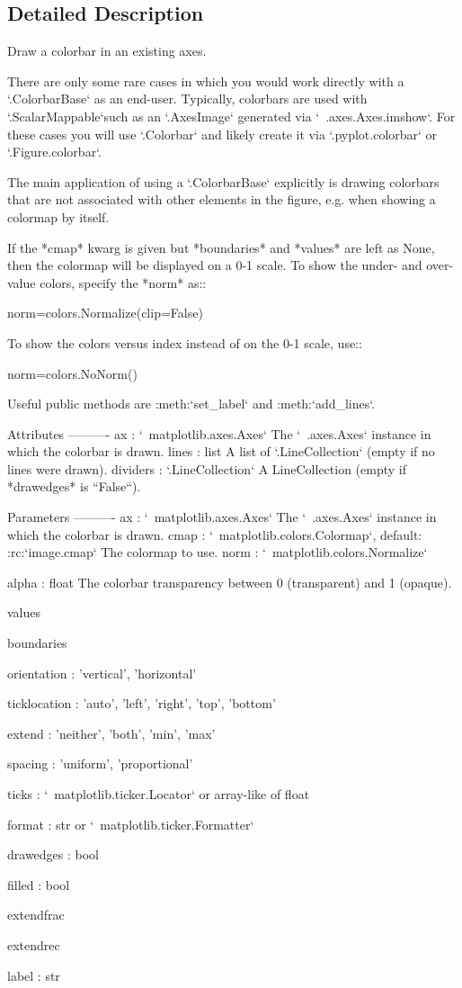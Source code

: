 \subsection{Detailed Description}
\begin{DoxyVerb}Draw a colorbar in an existing axes.

There are only some rare cases in which you would work directly with a
`.ColorbarBase` as an end-user. Typically, colorbars are used
with `.ScalarMappable`\s such as an `.AxesImage` generated via
`~.axes.Axes.imshow`. For these cases you will use `.Colorbar` and
likely create it via `.pyplot.colorbar` or `.Figure.colorbar`.

The main application of using a `.ColorbarBase` explicitly is drawing
colorbars that are not associated with other elements in the figure, e.g.
when showing a colormap by itself.

If the *cmap* kwarg is given but *boundaries* and *values* are left as
None, then the colormap will be displayed on a 0-1 scale. To show the
under- and over-value colors, specify the *norm* as::

    norm=colors.Normalize(clip=False)

To show the colors versus index instead of on the 0-1 scale,
use::

    norm=colors.NoNorm()

Useful public methods are :meth:`set_label` and :meth:`add_lines`.

Attributes
----------
ax : `~matplotlib.axes.Axes`
    The `~.axes.Axes` instance in which the colorbar is drawn.
lines : list
    A list of `.LineCollection` (empty if no lines were drawn).
dividers : `.LineCollection`
    A LineCollection (empty if *drawedges* is ``False``).

Parameters
----------
ax : `~matplotlib.axes.Axes`
    The `~.axes.Axes` instance in which the colorbar is drawn.
cmap : `~matplotlib.colors.Colormap`, default: :rc:`image.cmap`
    The colormap to use.
norm : `~matplotlib.colors.Normalize`

alpha : float
    The colorbar transparency between 0 (transparent) and 1 (opaque).

values

boundaries

orientation : {'vertical', 'horizontal'}

ticklocation : {'auto', 'left', 'right', 'top', 'bottom'}

extend : {'neither', 'both', 'min', 'max'}

spacing : {'uniform', 'proportional'}

ticks : `~matplotlib.ticker.Locator` or array-like of float

format : str or `~matplotlib.ticker.Formatter`

drawedges : bool

filled : bool

extendfrac

extendrec

label : str
\end{DoxyVerb}
 

